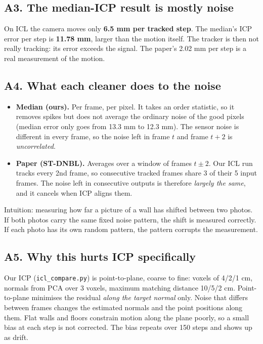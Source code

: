 \documentclass[11pt,a4paper]{article}
\begin{document}
\subsection*{A3. The median-ICP result is mostly noise}
On ICL the camera moves only \textbf{6.5 mm per tracked step}. The median's ICP error per step is \textbf{11.78 mm}, larger than the motion itself. The tracker is then not really tracking: its error exceeds the signal. The paper's 2.02 mm per step is a real measurement of the motion.

\subsection*{A4. What each cleaner does to the noise}
\begin{itemize}[nosep]
\item \textbf{Median (ours).} Per frame, per pixel. It takes an order statistic, so it removes spikes but does not average the ordinary noise of the good pixels (median error only goes from 13.3 mm to 12.3 mm). The sensor noise is different in every frame, so the noise left in frame $t$ and frame $t+2$ is \emph{uncorrelated}.
\item \textbf{Paper (ST-DNBL).} Averages over a window of frames $t\pm2$. Our ICL run tracks every 2nd frame, so consecutive tracked frames share 3 of their 5 input frames. The noise left in consecutive outputs is therefore \emph{largely the same}, and it cancels when ICP aligns them.
\end{itemize}
Intuition: measuring how far a picture of a wall has shifted between two photos. If both photos carry the same fixed noise pattern, the shift is measured correctly. If each photo has its own random pattern, the pattern corrupts the measurement.

\subsection*{A5. Why this hurts ICP specifically}
Our ICP (\texttt{icl\_compare.py}) is point-to-plane, coarse to fine: voxels of 4/2/1 cm, normals from PCA over 3 voxels, maximum matching distance 10/5/2 cm. Point-to-plane minimises the residual \emph{along the target normal} only. Noise that differs between frames changes the estimated normals and the point positions along them. Flat walls and floors constrain motion along the plane poorly, so a small bias at each step is not corrected. The bias repeats over 150 steps and shows up as drift.
\end{document}
